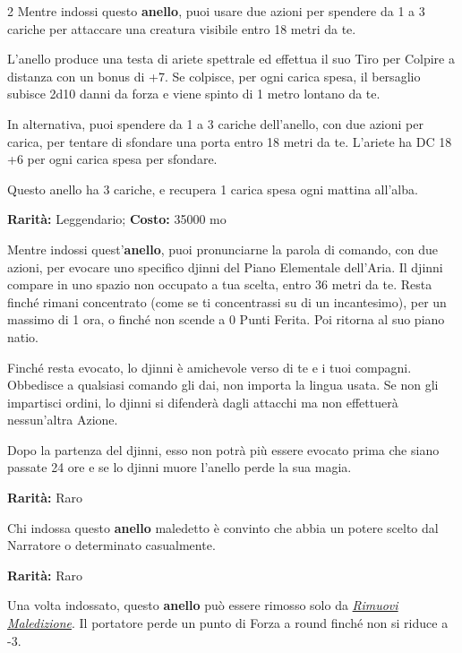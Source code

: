 \begin{multicols}{2}
Mentre indossi questo \textbf{anello}, puoi usare due azioni per spendere da 1 a 3 cariche per attaccare una creatura visibile entro 18 metri da te.

L'anello produce una testa di ariete spettrale ed effettua il suo Tiro per Colpire a distanza con un bonus di +7. Se colpisce, per ogni carica spesa, il bersaglio subisce 2d10 danni da forza e viene spinto di 1 metro lontano da te.

In alternativa, puoi spendere da 1 a 3 cariche dell'anello, con due azioni per carica, per tentare di sfondare una porta entro 18 metri da te. L'ariete ha DC 18 +6 per ogni carica spesa per sfondare.

Questo anello ha 3 cariche, e recupera 1 carica spesa ogni mattina all'alba.


\textbf{Rarità:} Leggendario; \textbf{Costo:} 35000 mo

Mentre indossi quest'\textbf{anello}, puoi pronunciarne la parola di comando, con due azioni, per evocare uno specifico djinni del Piano Elementale dell'Aria. Il djinni compare in uno spazio non occupato a tua scelta, entro 36 metri da te. Resta finché rimani concentrato (come se ti concentrassi su di un incantesimo), per un massimo di 1 ora, o finché non scende a 0 Punti Ferita. Poi ritorna al suo piano natio.

Finché resta evocato, lo djinni è amichevole verso di te e i tuoi compagni. Obbedisce a qualsiasi comando gli dai, non importa la lingua usata. Se non gli impartisci ordini, lo djinni si difenderà dagli attacchi ma non effettuerà nessun'altra Azione.

Dopo la partenza del djinni, esso non potrà più essere evocato prima che siano passate 24 ore e se lo djinni muore l'anello perde la sua magia.


\textbf{Rarità:} Raro

Chi indossa questo \textbf{anello} maledetto è convinto che abbia un potere scelto dal Narratore o determinato casualmente.


\textbf{Rarità:} Raro

Una volta indossato, questo \textbf{anello} può essere rimosso solo da \emph{\hyperlink{Rimuovi Maledizione}{Rimuovi Maledizione}}. Il portatore perde un punto di Forza a round finché non si riduce a -3.


\end{multicols}
